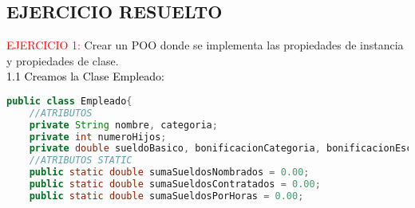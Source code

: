 \documentclass{article}
\begin{document}
\begin{itemize}
    \section{EJERCICIO RESUELTO}
	\begin{itemize}
        \textcolor{red}{EJERCICIO 1:} Crear un POO donde se implementa las propiedades de instancia y propiedades de clase. 
        \newline
        \\
        \textcolor{black}{1.1 Creamos la Clase Empleado:} 
		\begin{lstlisting}[language=java]
public class Empleado{
    //ATRIBUTOS
    private String nombre, categoria;
    private int numeroHijos;
    private double sueldoBasico, bonificacionCategoria, bonificacionEscolaridad, sueldoNeto;
    //ATRIBUTOS STATIC
    public static double sumaSueldosNombrados = 0.00;
    public static double sumaSueldosContratados = 0.00;
    public static double sumaSueldosPorHoras = 0.00;


\end{lstlisting}
\end{itemize}
\end{itemize}
\end{document}
